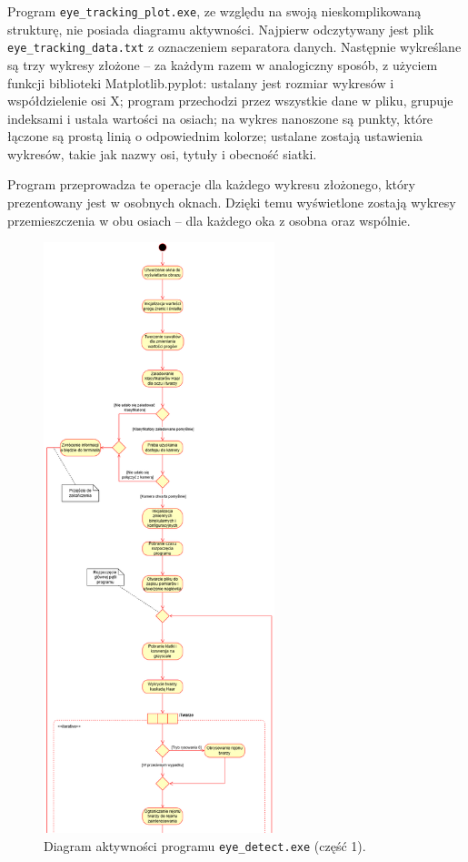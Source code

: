 \documentclass[a4paper,twoside,12pt]{book}
\begin{document}
Program \texttt{eye\_\-tracking\_\-plot.exe}, ze względu na swoją nieskomplikowaną strukturę, nie posiada diagramu aktywności. Najpierw odczytywany jest plik \texttt{eye\_tracking\_data.txt} z oznaczeniem separatora danych. Następnie wykreślane są trzy wykresy złożone -- za każdym razem w analogiczny sposób, z użyciem funkcji biblioteki Matplotlib.pyplot: ustalany jest rozmiar wykresów i współdzielenie osi X; program przechodzi przez wszystkie dane w pliku, grupuje indeksami i ustala wartości na osiach; na wykres nanoszone są punkty, które łączone są prostą linią o odpowiednim kolorze; ustalane zostają ustawienia wykresów, takie jak nazwy osi, tytuły i obecność siatki.

Program przeprowadza te operacje dla każdego wykresu złożonego, który prezentowany jest w osobnych oknach. Dzięki temu wyświetlone zostają wykresy przemieszczenia w obu osiach -- dla każdego oka z osobna oraz wspólnie.

\begin{figure}[htbp]
	\centering
	\includegraphics[width=0.6\textwidth, height=0.96\textheight]{pic/diagram aktywności/druga próba/diagram aktywności 1.png}
	\caption{Diagram aktywności programu \texttt{eye\-\_detect.exe} (część 1).}
	\label{fig:diagram-aktywnosci-1}
\end{figure}
\end{document}
